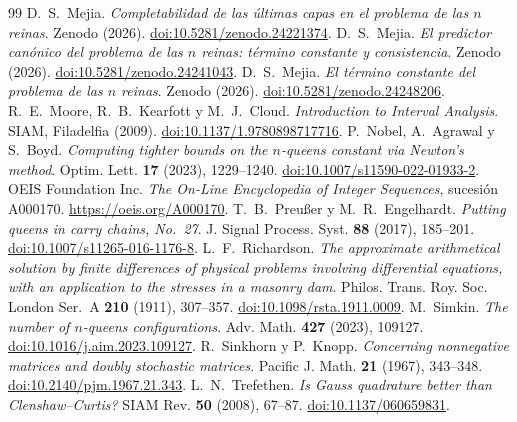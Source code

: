 \begin{thebibliography}{99}
D.~S.~Mejia.
\emph{Completabilidad de las últimas capas en el problema de las $n$ reinas}.
Zenodo (2026). \href{https://doi.org/10.5281/zenodo.24221374}{doi:10.5281/zenodo.24221374}.
D.~S.~Mejia.
\emph{El predictor canónico del problema de las $n$ reinas: término constante y consistencia}.
Zenodo (2026). \href{https://doi.org/10.5281/zenodo.24241043}{doi:10.5281/zenodo.24241043}.
D.~S.~Mejia. \emph{El término constante del problema de las $n$ reinas}.
Zenodo (2026). \href{https://doi.org/10.5281/zenodo.24248206}{doi:10.5281/zenodo.24248206}.
\label{bib:moore}
R.~E.~Moore, R.~B.~Kearfott y M.~J.~Cloud.
\emph{Introduction to Interval Analysis}.
SIAM, Filadelfia (2009).
\href{https://doi.org/10.1137/1.9780898717716}{doi:10.1137/1.9780898717716}.
P.~Nobel, A.~Agrawal y S.~Boyd.
\emph{Computing tighter bounds on the $n$-queens constant via Newton's method}.
Optim. Lett. \textbf{17} (2023), 1229--1240.
\href{https://doi.org/10.1007/s11590-022-01933-2}{doi:10.1007/s11590-022-01933-2}.
OEIS Foundation Inc.
\emph{The On-Line Encyclopedia of Integer Sequences}, sucesión A000170.
\url{https://oeis.org/A000170}.
T.~B.~Preußer y M.~R.~Engelhardt.
\emph{Putting queens in carry chains, No.~27}.
J. Signal Process. Syst. \textbf{88} (2017), 185--201.
\href{https://doi.org/10.1007/s11265-016-1176-8}{doi:10.1007/s11265-016-1176-8}.
L.~F.~Richardson.
\emph{The approximate arithmetical solution by finite differences of physical problems involving
differential equations, with an application to the stresses in a masonry dam}.
Philos. Trans. Roy. Soc. London Ser.~A \textbf{210} (1911), 307--357.
\href{https://doi.org/10.1098/rsta.1911.0009}{doi:10.1098/rsta.1911.0009}.
M.~Simkin. \emph{The number of $n$-queens configurations}.
Adv. Math. \textbf{427} (2023), 109127.
\href{https://doi.org/10.1016/j.aim.2023.109127}{doi:10.1016/j.aim.2023.109127}.
R.~Sinkhorn y P.~Knopp.
\emph{Concerning nonnegative matrices and doubly stochastic matrices}.
Pacific J. Math. \textbf{21} (1967), 343--348.
\href{https://doi.org/10.2140/pjm.1967.21.343}{doi:10.2140/pjm.1967.21.343}.
L.~N.~Trefethen.
\emph{Is Gauss quadrature better than Clenshaw--Curtis?}
SIAM Rev. \textbf{50} (2008), 67--87.
\href{https://doi.org/10.1137/060659831}{doi:10.1137/060659831}.
\end{thebibliography}
